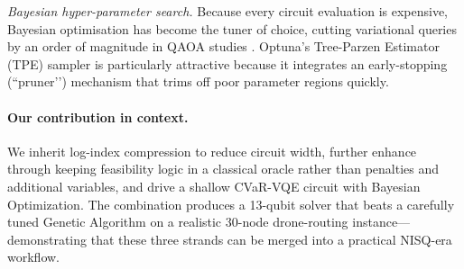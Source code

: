 \textit{Bayesian hyper-parameter search.}  
Because every circuit evaluation is expensive, Bayesian optimisation
has become the tuner of choice, cutting variational queries by an order
of magnitude in QAOA studies \cite{tibaldi_bayesian_2023}.  
Optuna’s Tree-Parzen Estimator (TPE) sampler
\cite{akiba_optuna_2019} is particularly attractive because it
integrates an early-stopping (“pruner’’) mechanism that trims off poor
parameter regions quickly.

\paragraph{Our contribution in context.}
We inherit log-index compression to reduce circuit width,
further enhance through keeping feasibility logic in a classical oracle rather than penalties and additional variables,
and drive a shallow CVaR-VQE circuit with Bayesian Optimization.
The combination produces a 13-qubit solver that
beats a carefully tuned Genetic Algorithm on a realistic 30-node
drone-routing instance—demonstrating that these three strands can be
merged into a practical NISQ-era workflow.
